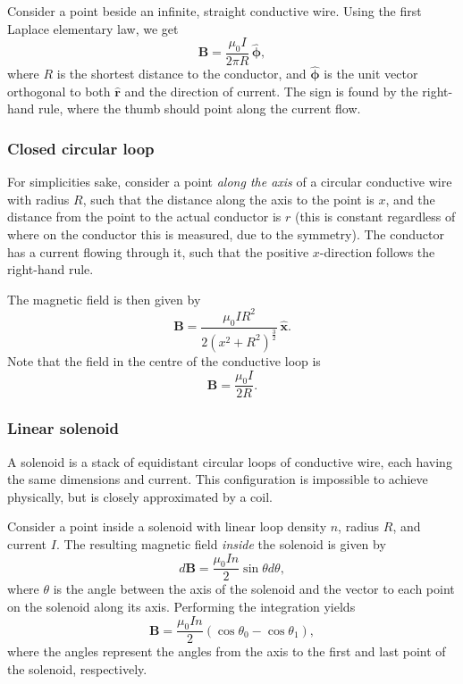 \documentclass[a4paper, 12pt]{article}
\renewcommand{\vec}[1]{\bm{#1}}
\newcommand{\B}{\ensuremath{\vec{B}}}
\let\tmp\hat
\renewcommand{\hat}[1]{\vec{\tmp{#1}}}
\begin{document}
            Consider a point beside an infinite, straight conductive wire. Using the first Laplace elementary law, we get 
            \begin{equation}
                \B = \frac{\mu_0 I}{2\pi R}\,\hat{\phi},
            \end{equation}
            where $R$ is the shortest distance to the conductor, 
            and $\hat{\phi}$ is the  unit vector orthogonal to both $\hat{r}$ and the direction of current.
            The sign is found by the right-hand rule, where the thumb should point along the current flow.
            
        \subsubsection{Closed circular loop}
            For simplicities sake, consider a point \textit{along the axis} of a circular conductive wire with radius $R$, 
            such that the distance along the axis to the point is $x$, 
            and the distance from the point to the actual conductor is $r$ 
            (this is constant regardless of where on the conductor this is measured, due to the symmetry).
            The conductor has a current flowing through it, such that the positive $x$-direction follows the right-hand rule. 

            The magnetic field is then given by
            \begin{equation}
                \B = \frac{\mu_0 I R^2}{2 \left(x^2 + R^2\right)^\frac{3}{2}}\,\hat{x}.
            \end{equation}
            Note that the field in the centre of the conductive loop is
            \begin{equation}
                \B = \frac{\mu_0 I}{2R}.
            \end{equation}
        
        \subsubsection{Linear solenoid}
            A solenoid is a stack of equidistant circular loops of conductive wire, each having the same dimensions and current. 
            This configuration is impossible to achieve physically, but is closely approximated by a coil. 

            Consider a point inside a solenoid with linear loop density $n$, radius $R$, and current $I$. 
            The resulting magnetic field \textit{inside} the solenoid is given by
            \begin{equation}
                d\B = \frac{\mu_0 I n}{2}\sin\theta d\theta,
            \end{equation}
            where $\theta$ is the angle between the axis of the solenoid and the vector to each point on the solenoid along its axis.
            Performing the integration yields
            \begin{equation}
                \B = \frac{\mu_0 In}{2}\left(\cos\theta_0 - \cos\theta_1\right),
            \end{equation}
            where the angles represent the angles from the axis to the first and last point of the solenoid, respectively. 
\end{document}
